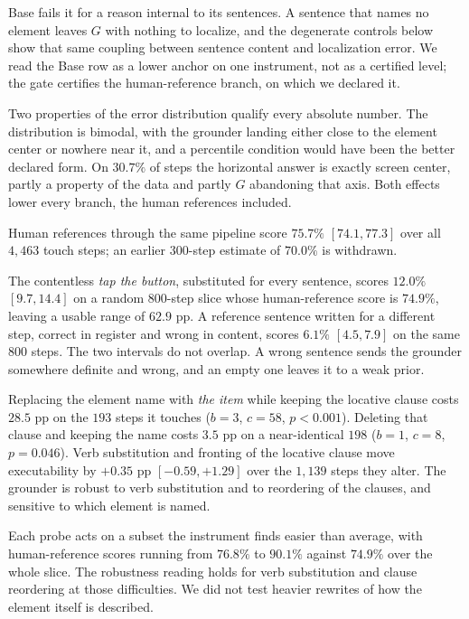 \documentclass[conference]{IEEEtran}
\begin{document}
Base fails it for a reason internal to its sentences. A sentence that names no element leaves $G$
with nothing to localize, and the degenerate controls below show that same coupling between
sentence content and localization error. We read the Base row as a lower anchor on one instrument,
not as a certified level; the gate certifies the human-reference branch, on which we declared it.

Two properties of the error distribution qualify every absolute number. The distribution is
bimodal, with the grounder landing either close to the element center or nowhere near it, and a
percentile condition would have been the better declared form. On $30.7\%$ of steps the
horizontal answer is exactly screen center, partly a property of the data and partly $G$
abandoning that axis. Both effects lower every branch, the human references included.

Human references through the same pipeline score $75.7\%$ $[74.1, 77.3]$
over all $4{,}463$ touch steps; an earlier $300$-step estimate of $70.0\%$ is withdrawn.

The contentless \emph{tap the button}, substituted for every sentence,
scores $12.0\%$ $[9.7, 14.4]$ on a random $800$-step slice whose human-reference score is
$74.9\%$, leaving a usable range of $62.9$ pp. A reference sentence written for a
different step, correct in register and wrong in content, scores $6.1\%$ $[4.5, 7.9]$ on the same
$800$ steps. The two intervals do not overlap. A wrong sentence sends the grounder somewhere
definite and wrong, and an empty one leaves it to a weak prior.

Replacing the element name with \emph{the item} while keeping the
locative clause costs $28.5$ pp on the $193$ steps it touches ($b{=}3$, $c{=}58$, $p<0.001$).
Deleting that clause and keeping the name costs $3.5$ pp on a near-identical $198$ ($b{=}1$,
$c{=}8$, $p{=}0.046$). Verb substitution and fronting of the locative clause move executability by
$+0.35$ pp $[-0.59, +1.29]$ over the $1{,}139$ steps they alter. The grounder is robust to verb
substitution and to reordering of the clauses, and sensitive to which element is named.

Each probe acts on a subset the instrument finds easier than average, with human-reference
scores running from $76.8\%$ to $90.1\%$ against $74.9\%$ over the whole slice. The robustness
reading holds for verb substitution and clause reordering at those difficulties. We did not
test heavier rewrites of how the element itself is described.
\end{document}
